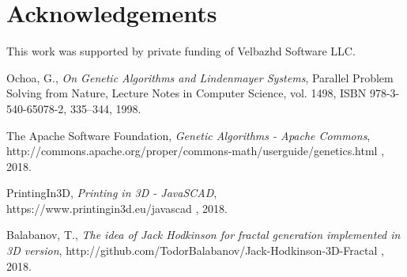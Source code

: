 \documentclass{llncs}
\begin{document}
\section*{Acknowledgements}
This work was supported by private funding of Velbazhd Software LLC.

\begin{thebibliography}{99}

 Ochoa, G., \textit{On Genetic Algorithms and Lindenmayer Systems}, Parallel Problem Solving from Nature, Lecture Notes in Computer Science, vol. 1498, ISBN 978-3-540-65078-2, 335--344, 1998.

 The Apache Software Foundation, \textit{Genetic Algorithms - Apache Commons}, http://commons.apache.org/proper/commons-math/userguide/genetics.html , 2018.

 PrintingIn3D, \textit{Printing in 3D - JavaSCAD}, https://www.printingin3d.eu/javascad , 2018.

 Balabanov, T., \textit{The idea of Jack Hodkinson for fractal generation implemented in 3D version}, http://github.com/TodorBalabanov/Jack-Hodkinson-3D-Fractal , 2018.

\end{thebibliography}
\end{document}
